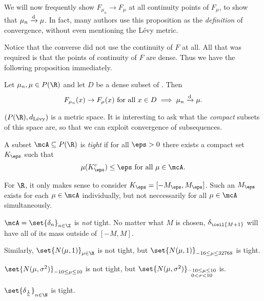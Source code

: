 \begin{remarks}
    \item We will now frequently show $F_{\mu_n} \to F_\mu$ at all
    continuity points of $F_\mu$, to show that $\mu_n \xrightarrow{\text{d}} \mu$.
    In fact, many authors use this proposition as the \emph{definition} of
    convergence, without even mentioning the L\'evy metric.
    \item Notice that the converse did not use the continuity of $F$ at all.
    All that was required is that the points of continuity of $F$ are dense.
    Thus we have the following proposition immediately.
\end{remarks}
\begin{proposition} \label{thm:dto:dense}
    Let $\mu_n, \mu \in P(\R)$ and let $D$ be a dense subset of \R.
    Then \[
        F_{\mu_n}(x) \to F_\mu(x) \text{ for all } x \in D
        \implies \mu_n \xrightarrow{\text{d}} \mu.
    \]
\end{proposition}

$(P(\R), d_{\text{L\'evy}})$ is a metric space.
It is interesting to ask what the \emph{compact} subsets of this space are,
so that we can exploit convergence of subsequences.

\begin{definition*} \label{def:tight}
    A subset $\mcA \subseteq P(\R)$ is \emph{tight} if for all $\eps > 0$
    there exists a compact set $K_\eps$ such that \[
        \mu(K_\eps^c) \le \eps \text{ for all } \mu \in \mcA.
    \]
\end{definition*}
For $\R$, it only makes sense to consider $K_\eps = [-M_\eps, M_\eps]$.
Such an $M_\eps$ exists for each $\mu \in \mcA$ individually, but not
neccessarily for all $\mu \in \mcA$ simultaneously.
\begin{examples}
    \item $\mcA = \set{\delta_n}_{n \in \Z}$ is \emph{not} tight.
        No matter what $M$ is chosen, $\delta_{\ceil{M+1}}$ will have all
        of its mass outside of $[-M, M]$.
    \item Similarly, $\set{N(\mu, 1)}_{\mu \in \R}$ is not tight,
        but $\set{N(\mu, 1)}_{-16 \le \mu \le 32768}$ is tight.
    \item $\set{N(\mu, \sigma^2)}_{-10 \le \mu \le 10}$ is not tight, but
        $\set{N(\mu, \sigma^2)}_{\substack{-10 \le \mu \le 10 \\
                                0 < \sigma < 10}}$ is.
    \item $\set{\delta_{\frac1n}}_{n \in \N}$ is tight.
\end{examples}

